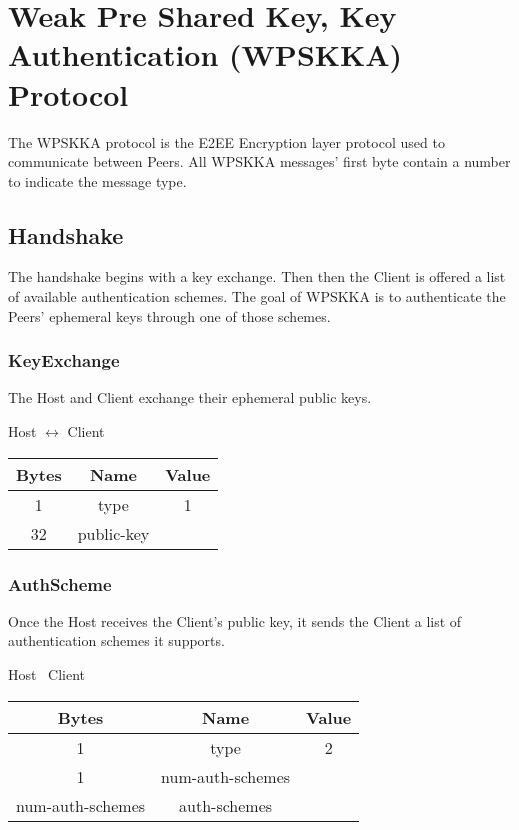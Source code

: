 \section{Weak Pre Shared Key, Key Authentication (WPSKKA) Protocol}

The WPSKKA protocol is the E2EE Encryption layer protocol used to communicate between Peers. All WPSKKA messages'
first byte contain a number to indicate
the message type.\\

\subsection{Handshake}

The handshake begins with a key exchange.
Then then the Client is offered a list of available authentication schemes.
The goal of WPSKKA is to authenticate the Peers' ephemeral keys through one of those schemes.

\subsubsection{KeyExchange}

The Host and Client exchange their ephemeral public keys.

\begin{center}
    Host $\leftrightarrow$ Client\\
    \begin{tabular}{|c|c|c|}
        \hline
        \textbf{Bytes} & \textbf{Name} & \textbf{Value} \\
        \hline
        1              & type          & 1              \\
        \hline
        32             & public-key    &                \\
        \hline
    \end{tabular}
\end{center}

\subsubsection{AuthScheme}

Once the Host receives the Client's public key, it sends the Client a list of authentication schemes it supports.

\begin{center}
    Host \textrightarrow\ Client\\
    \begin{tabular}{|c|c|c|}
        \hline
        \textbf{Bytes}   & \textbf{Name}    & \textbf{Value} \\
        \hline
        1                & type             & 2              \\
        \hline
        1                & num-auth-schemes &                \\
        \hline
        num-auth-schemes & auth-schemes     &                \\
        \hline
    \end{tabular}
\end{center}

